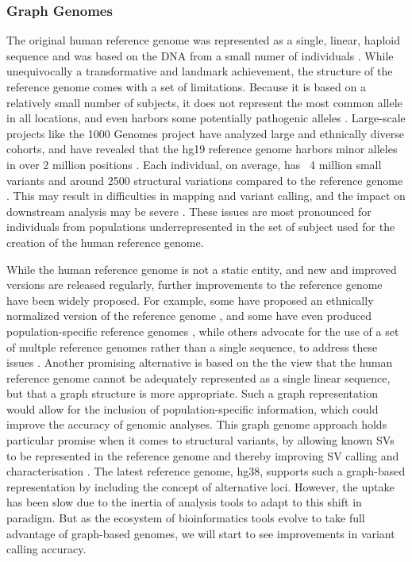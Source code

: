\subsubsection{Graph Genomes}
The original human reference genome was represented as a single, linear, haploid sequence and was based on the DNA from a small numer of individuals \cite{venter2001sequence}.
While unequivocally a transformative and landmark achievement, the structure of the reference genome comes with a set of limitations. Because it is based on a relatively small number of subjects, it does not represent the most common allele in all locations, and even harbors some potentially pathogenic alleles \cite{barbitoff2018catching,koko2018challenges,ferrarini2015use}. Large-scale projects like the 1000 Genomes project \cite{10002010map} have analyzed large and ethnically diverse cohorts, and have revealed that the hg19 reference genome harbors minor alleles in over 2 million positions \cite{10002015global}.
Each individual, on average, has ~4 million small variants and around 2500 structural variations compared to the reference genome \cite{10002015global, sudmant2015structural}. This may result in difficulties in mapping and variant calling, and the impact on downstream analysis may be severe \cite{karthikeyan2017hg19k}. These issues are most pronounced for individuals from populations underrepresented in the set of subject used for the creation of the human reference genome.

While the human reference genome is not a static entity, and new and improved versions are released regularly, further improvements to the reference genome have been widely proposed. For example, some have proposed an ethnically normalized version of the reference genome \cite{shukla2019hg19kindel}, and some have even produced population-specific reference genomes \cite{denmark, korea}, while others advocate for the use of a set of multple reference genomes rather than a single sequence, to address these issues \cite{schneeberger2009simultaneous,paten2017genome}. Another promising alternative is based on the the view that the human reference genome cannot be adequately represented as a single linear sequence, but that a graph structure is more appropriate. Such a graph representation would allow for the inclusion of population-specific information, which could improve the accuracy of genomic analyses. This graph genome approach holds particular promise when it comes to structural variants, by allowing known SVs to be represented in the reference genome and thereby improving SV calling and characterisation \cite{rakocevic2019fast}.
The latest reference genome, hg38, supports such a graph-based representation by including the concept of alternative loci. However, the uptake has been slow due to the inertia of analysis tools to adapt to this shift in paradigm. But as the ecosystem of bioinformatics tools evolve to take full advantage of graph-based genomes, we will start to see improvements in variant calling accuracy.


